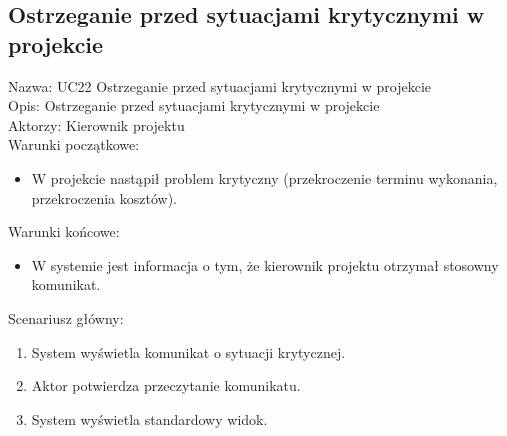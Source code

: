 \subsection{Ostrzeganie przed sytuacjami krytycznymi w projekcie}
\begin{adjustwidth}{5em}{0pt}
Nazwa: UC22 Ostrzeganie przed sytuacjami krytycznymi w projekcie \\
Opis: Ostrzeganie przed sytuacjami krytycznymi w projekcie \\
Aktorzy: Kierownik projektu \\
Warunki początkowe:
\begin{itemize}
\item W projekcie nastąpił problem krytyczny (przekroczenie terminu wykonania, przekroczenia kosztów).
\end{itemize}
Warunki końcowe:
\begin{itemize}
\item W systemie jest informacja o tym, że kierownik projektu otrzymał stosowny komunikat.
\end{itemize}
Scenariusz główny:
\begin{enumerate}
\item System wyświetla komunikat o sytuacji krytycznej.
\item Aktor potwierdza przeczytanie komunikatu.
\item System wyświetla standardowy widok.
\end{enumerate}
\end{adjustwidth}

